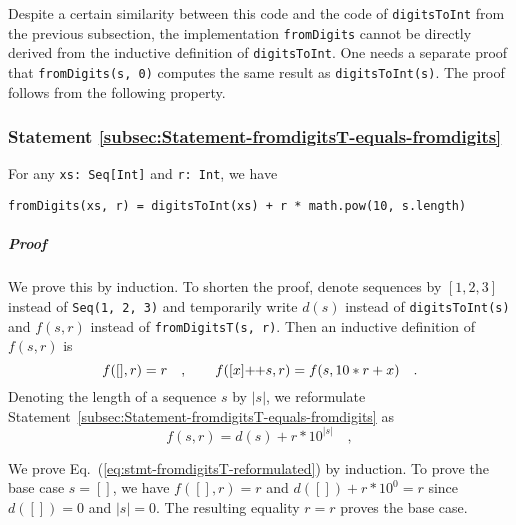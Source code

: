 \noindent Despite a certain similarity between this code and the code
of \lstinline!digitsToInt! from the previous subsection, the implementation
\lstinline!fromDigits! cannot be directly derived from the inductive
definition of \lstinline!digitsToInt!. One needs a separate proof
that \lstinline!fromDigits(s, 0)! computes the same result as \lstinline!digitsToInt(s)!.
The proof follows from the following property.

\subsubsection{Statement \label{subsec:Statement-fromdigitsT-equals-fromdigits}\ref{subsec:Statement-fromdigitsT-equals-fromdigits}}

For any \lstinline!xs: Seq[Int]! and \lstinline!r: Int!, we have
\begin{lstlisting}
fromDigits(xs, r) = digitsToInt(xs) + r * math.pow(10, s.length)
\end{lstlisting}


\subparagraph{Proof}

We prove this by induction. To shorten the proof, denote sequences
by $\left[1,2,3\right]$ instead of \lstinline!Seq(1, 2, 3)! and
temporarily write $d(s)$ instead of \lstinline!digitsToInt(s)! and
$f(s,r)$ instead of \lstinline!fromDigitsT(s, r)!. Then an inductive
definition of $f(s,r)$ is
\begin{equation}
f([],r)=r\quad,\quad\quad f([x]\negmedspace+\negthickspace+s,r)=f(s,10*r+x)\quad.\label{eq:stmt-fromdigitsT-expand-f}
\end{equation}
Denoting the length of a sequence $s$ by $\left|s\right|$, we reformulate
Statement~\ref{subsec:Statement-fromdigitsT-equals-fromdigits} as
\begin{equation}
f(s,r)=d(s)+r*10^{\left|s\right|}\quad,\label{eq:stmt-fromdigitsT-reformulated}
\end{equation}

We prove Eq.~(\ref{eq:stmt-fromdigitsT-reformulated}) by induction.
To prove the base case $s=\left[\right]$, we have $f(\left[\right],r)=r$
and $d(\left[\right])+r*10^{0}=r$ since $d(\left[\right])=0$ and
$\left|s\right|=0$. The resulting equality $r=r$ proves the base
case. 

